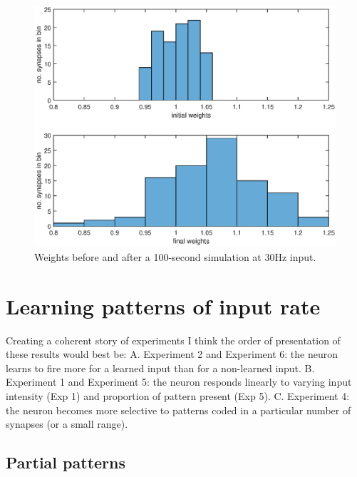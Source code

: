 \documentclass[a4paper,12pt]{report}
\theoremstyle{definition}
\begin{document}
\begin{figure}[h]
    \includegraphics[width=\textwidth]{figures/fig_weighthistogram_30Hz.eps}
    \caption{Weights before and after a 100-second simulation at 30Hz input.}
    \label{fig:weighthistogram}
\end{figure}















\section{Learning patterns of input rate}

Creating a coherent story of experiments
I think the order of presentation of these results would best be:
A. Experiment 2 and Experiment 6: the neuron learns to fire more for a learned input than for a non-learned input.
B. Experiment 1 and Experiment 5: the neuron responds linearly to varying input intensity (Exp 1) and proportion of pattern present (Exp 5).
C. Experiment 4: the neuron becomes more selective to patterns coded in a particular number of synapses (or a small range).


\subsection{Partial patterns}
\end{document}
